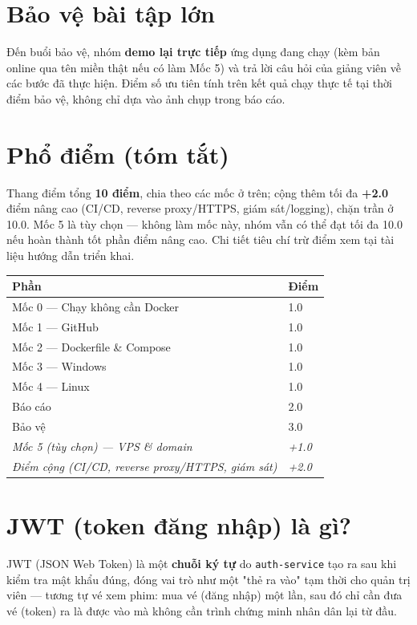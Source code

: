 \documentclass[a4paper,11pt]{article}
\begin{document}
\section{Bảo vệ bài tập lớn}

Đến buổi bảo vệ, nhóm \textbf{demo lại trực tiếp} ứng dụng đang chạy (kèm bản online qua tên miền thật nếu có làm Mốc 5) và trả lời câu hỏi của giảng viên về các bước đã thực hiện. Điểm số ưu tiên tính trên kết quả chạy thực tế tại thời điểm bảo vệ, không chỉ dựa vào ảnh chụp trong báo cáo.

\section{Phổ điểm (tóm tắt)}

Thang điểm tổng \textbf{10 điểm}, chia theo các mốc ở trên; cộng thêm tối đa \textbf{+2.0} điểm nâng cao (CI/CD, reverse proxy/HTTPS, giám sát/logging), chặn trần ở 10.0. Mốc 5 là tùy chọn — không làm mốc này, nhóm vẫn có thể đạt tối đa 10.0 nếu hoàn thành tốt phần điểm nâng cao. Chi tiết tiêu chí trừ điểm xem tại tài liệu hướng dẫn triển khai.

\begin{longtable}{@{}p{9cm} p{2cm}@{}}
\toprule
\textbf{Phần} & \textbf{Điểm} \\
\midrule
\endhead
Mốc 0 — Chạy không cần Docker & 1.0 \\
Mốc 1 — GitHub & 1.0 \\
Mốc 2 — Dockerfile \& Compose & 1.0 \\
Mốc 3 — Windows & 1.0 \\
Mốc 4 — Linux & 1.0 \\
Báo cáo & 2.0 \\
Bảo vệ & 3.0 \\
\addlinespace
\textit{Mốc 5 (tùy chọn) — VPS \& domain} & \textit{+1.0} \\
\textit{Điểm cộng (CI/CD, reverse proxy/HTTPS, giám sát)} & \textit{+2.0} \\
\bottomrule
\end{longtable}

\section*{JWT (token đăng nhập) là gì?}

JWT (JSON Web Token) là một \textbf{chuỗi ký tự} do \texttt{auth-service} tạo ra sau khi kiểm tra mật khẩu đúng, đóng vai trò như một "thẻ ra vào" tạm thời cho quản trị viên — tương tự vé xem phim: mua vé (đăng nhập) một lần, sau đó chỉ cần đưa vé (token) ra là được vào mà không cần trình chứng minh nhân dân lại từ đầu.
\end{document}
